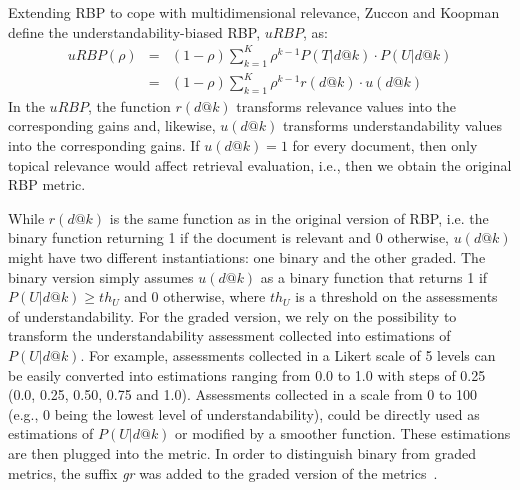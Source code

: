 Extending RBP to cope with multidimensional relevance, Zuccon and Koopman~\cite{zuccon14} define the understandability-biased RBP, $uRBP$, as: 
%
\begin{eqnarray}
    uRBP(\rho) &=& (1-\rho) \sum_{k=1}^{K} \rho^{k-1} P(T|d@k) \cdot P(U|d@k)\\ 
&=& (1-\rho) \sum_{k=1}^{K} \rho^{k-1} r(d@k) \cdot u(d@k)
\label{eq:RBP}
\end{eqnarray}
%
In the $uRBP$, the function $r(d@k)$ transforms relevance values into the corresponding gains and, likewise, $u(d@k)$ transforms understandability values into the corresponding gains. 
If $u(d@k)=1$ for every document, then only topical relevance would affect retrieval evaluation, i.e.,  then we obtain the original RBP metric.

While $r(d@k)$ is the same function as in the original version of RBP, i.e. the binary function returning 1 if the document is relevant and 0 otherwise, $u(d@k)$ might have two different instantiations: one binary and the other graded. The binary version simply assumes $u(d@k)$ as a binary function that returns 1 if $P(U|d@k) \geq th_U$ and 0 otherwise, where $th_U$ is a threshold on the assessments of understandability. 
For the graded version, we rely on the possibility to transform the understandability assessment collected into estimations of $P(U|d@k)$.
For example, assessments collected in a Likert scale of 5 levels can be easily converted into estimations ranging from 0.0 to 1.0 with steps of 0.25 (0.0, 0.25, 0.50, 0.75 and 1.0).
Assessments collected in a scale from 0 to 100 (e.g., 0 being the lowest level of understandability), could be directly used as estimations of $P(U|d@k)$ or modified by a smoother function.
These estimations are then plugged into the metric. In order to distinguish binary from graded metrics, the suffix \textit{gr} was added to the graded version of the metrics~\cite{zuccon16}.


